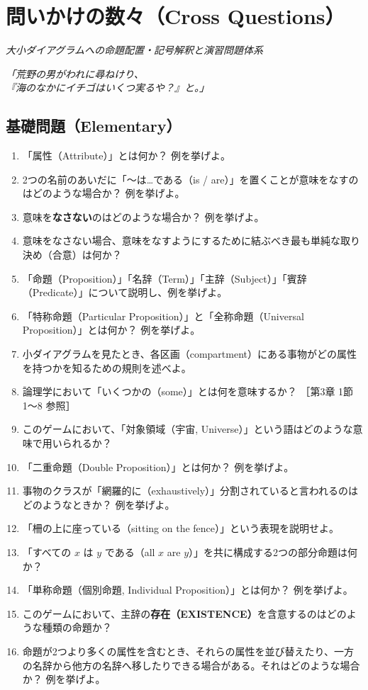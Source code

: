 \documentclass[a4paper,11pt,openany]{ltjsbook}
\begin{document}
\chapter{問いかけの数々（Cross Questions）}
\label{ch:ii}

\begin{center}
\large\textit{大小ダイアグラムへの命題配置・記号解釈と演習問題体系}
\end{center}
\vspace{4mm}

\begin{center}
\textit{「荒野の男がわれに尋ねけり、\\
『海のなかにイチゴはいくつ実るや？』と。」}
\end{center}

\section{基礎問題（Elementary）}

\begin{enumerate}[label=\textbf{\arabic*.}]
\item 「属性（Attribute）」とは何か？ 例を挙げよ。
\item 2つの名前のあいだに「〜は…である（is / are）」を置くことが意味をなすのはどのような場合か？ 例を挙げよ。
\item 意味を\textbf{なさない}のはどのような場合か？ 例を挙げよ。
\item 意味をなさない場合、意味をなすようにするために結ぶべき最も単純な取り決め（合意）は何か？
\item 「命題（Proposition）」「名辞（Term）」「主辞（Subject）」「賓辞（Predicate）」について説明し、例を挙げよ。
\item 「特称命題（Particular Proposition）」と「全称命題（Universal Proposition）」とは何か？ 例を挙げよ。
\item 小ダイアグラムを見たとき、各区画（compartment）にある事物がどの属性を持つかを知るための規則を述べよ。
\item 論理学において「いくつかの（some）」とは何を意味するか？ \hfill {\small ［第3章 1節 1〜8 参照］}
\item このゲームにおいて、「対象領域（宇宙, Universe）」という語はどのような意味で用いられるか？
\item 「二重命題（Double Proposition）」とは何か？ 例を挙げよ。
\item 事物のクラスが「網羅的に（exhaustively）」分割されていると言われるのはどのようなときか？ 例を挙げよ。
\item 「柵の上に座っている（sitting on the fence）」という表現を説明せよ。
\item 「すべての $x$ は $y$ である（all $x$ are $y$）」を共に構成する2つの部分命題は何か？
\item 「単称命題（個別命題, Individual Proposition）」とは何か？ 例を挙げよ。
\item このゲームにおいて、主辞の\textbf{存在（EXISTENCE）}を含意するのはどのような種類の命題か？
\item 命題が2つより多くの属性を含むとき、それらの属性を並び替えたり、一方の名辞から他方の名辞へ移したりできる場合がある。それはどのような場合か？ 例を挙げよ。
\end{enumerate}
\end{document}

